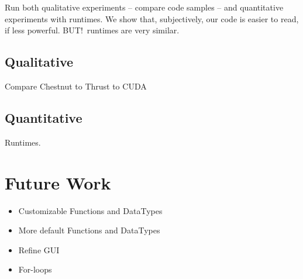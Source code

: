 \documentclass[twocolumn]{article}
\renewcommand{\|}{\origbar} %
\begin{document}
Run both qualitative experiments -- compare code samples -- and quantitative experiments with runtimes. We show that, subjectively, our code is easier to read, if less powerful. BUT!\ runtimes are very similar.

\subsection{Qualitative}

Compare Chestnut to Thrust to CUDA

\subsection{Quantitative}

Runtimes.

\section{Future Work}
\label{sec:future}

\begin{itemize}
  \item Customizable Functions and DataTypes
  \item More default Functions and DataTypes
  \item Refine GUI
  \item For-loops
\end{itemize}
\end{document}
